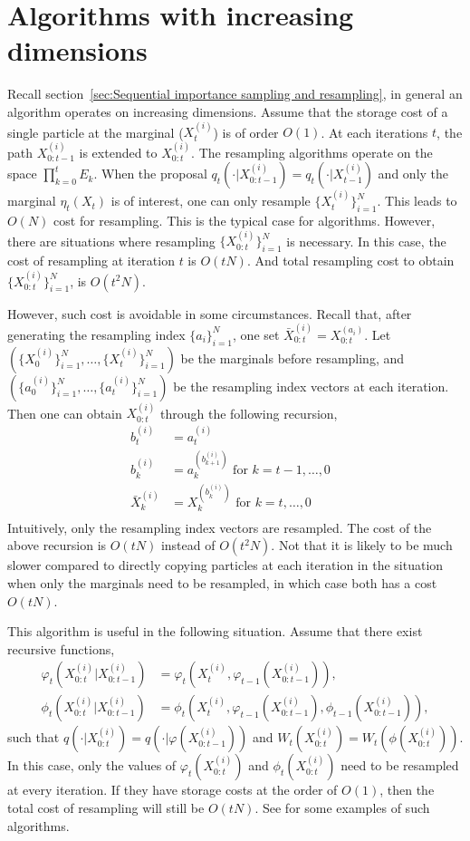 \section{Algorithms with increasing dimensions}
\label{sec:Algorithms with increasing dimensions}

Recall section~\ref{sec:Sequential importance sampling and resampling}, in
general an \sis algorithm operates on increasing dimensions. Assume that the
storage cost of a single particle at the marginal ($X_t^{(i)}$) is of order
$O(1)$. At each iterations $t$, the path $X_{0:t-1}^{(i)}$ is extended to
$X_{0:t}^{(i)}$. The resampling algorithms operate on the space
$\prod_{k=0}^tE_k$. When the proposal $q_t(\cdot|X_{0:t-1}^{(i)}) =
q_t(\cdot|X_{t-1}^{(i)})$ and only the marginal $\eta_t(X_t)$ is of interest,
one can only resample $\{X_t^{(i)}\}_{i=1}^N$. This leads to $O(N)$ cost for
resampling. This is the typical case for \smc algorithms. However, there are
situations where resampling $\{X_{0:t}^{(i)}\}_{i=1}^N$ is necessary. In this
case, the cost of resampling at iteration $t$ is $O(tN)$. And total resampling
cost to obtain $\{X_{0:t}^{(i)}\}_{i=1}^N$, is $O(t^2N)$.

However, such cost is avoidable in some circumstances. Recall that, after
generating the resampling index $\{a_i\}_{i=1}^N$, one set $\bar{X}_{0:t}^{(i)}
= X_{0:t}^{(a_i)}$. Let $(\{X_0^{(i)}\}_{i=1}^N,\dots,\{X_t^{(i)}\}_{i=1}^N)$
be the marginals before resampling, and
$(\{a_0^{(i)}\}_{i=1}^N,\dots,\{a_t^{(i)}\}_{i=1}^N)$ be the resampling index
vectors at each iteration. Then one can obtain $X_{0:t}^{(i)}$ through
the following recursion,
\begin{align*}
  b_t^{(i)} &= a_t^{(i)} & \\
  b_k^{(i)} &= a_{k}^{(b_{k + 1}^{(i)})} \text{ for } k = t - 1,\dots,0 \\
  \bar{X}_k^{(i)} &= X_k^{(b_k^{(i)})}   \text{ for } k = t,\dots,0\ \\
\end{align*}
Intuitively, only the resampling index vectors are resampled. The cost of the
above recursion is $O(tN)$ instead of $O(t^2N)$. Not that it is likely to be
much slower compared to directly copying particles at each iteration in the
situation when only the marginals need to be resampled, in which case both has
a cost $O(tN)$.

This algorithm is useful in the following situation. Assume that there exist
recursive functions,
\begin{align*}
\varphi_t(X_{0:t}^{(i)}|X_{0:t-1}^{(i)}) &=
\varphi_t(X_t^{(i)}, \varphi_{t-1}(X_{0:t-1}^{(i)})), \\
\phi_t(X_{0:t}^{(i)}|X_{0:t-1}^{(i)}) &=
\phi_t(X_t^{(i)}, \varphi_{t-1}(X_{0:t-1}^{(i)}), \phi_{t-1}(X_{0:t-1}^{(i)})),
\end{align*}
such that
$q(\cdot|X_{0:t}^{(i)}) = q(\cdot|\varphi(X_{0:t-1}^{(i)}))$ and
$W_t(X_{0:t}^{(i)}) = W_t(\phi(X_{0:t}^{(i)}))$. In this case, only the values
of $\varphi_t(X_{0:t}^{(i)})$ and $\phi_t(X_{0:t}^{(i)})$ need to be resampled
at every iteration. If they have storage costs at the order of $O(1)$, then the
total cost of resampling will still be $O(tN)$. See \textcite{stpf} for some
examples of such algorithms.


